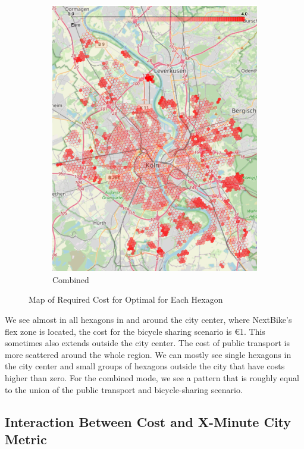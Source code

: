 \begin{figure}
\begin{subfigure}[b]{0.3\textwidth}
         \includegraphics[width=\textwidth]{Figures/results/cost/bicycle_public_transport_cost_map}
         \caption{Combined}
         \label{fig:bicycle_public_transport_cost_map}
     \end{subfigure}
       \caption{Map of Required Cost for Optimal for Each Hexagon}
        \label{fig:cost_map_per_scenario}
\end{figure}
We see almost in all hexagons in and around the city center, where NextBike's flex zone is located, the cost for the bicycle sharing scenario is \euro{1}.
This sometimes also extends outside the city center.
The cost of public transport is more scattered around the whole region. 
We can mostly see single hexagons in the city center and small groups of hexagons outside the city that have costs higher than zero.
For the combined mode, we see a pattern that is roughly equal to the union of the public transport and bicycle-sharing scenario.

\subsection{Interaction Between Cost and X-Minute City Metric}
\label{subsec:interaction_between_cost_and_15_minute_city_metric}

